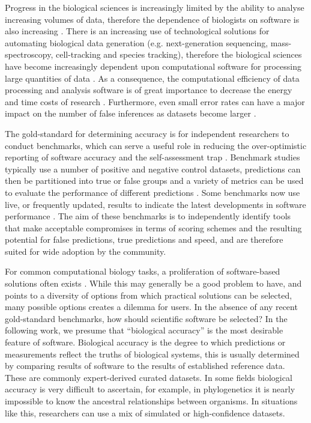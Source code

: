 \documentclass[fleqn,10pt]{SelfArx} %
\begin{document}
Progress in the biological sciences is increasingly limited by the
ability to analyse increasing volumes of data, therefore the
dependence of biologists on software is also increasing
\cite{Marx2013-zi}. There is an increasing use of technological
solutions for automating biological data generation
(e.g. next-generation sequencing, mass-spectroscopy, cell-tracking and
species tracking), therefore the biological sciences have become
increasingly dependent upon computational software for processing
large quantities of data \cite{Marx2013-zi}. As a consequence, the
computational efficiency of data processing and analysis software is
of great importance to decrease the energy and time costs of research
\cite{Gombiner2011-md}. Furthermore, even small error rates can have a
major impact on the number of false inferences as datasets become
larger \cite{Storey2003-cv}.

The gold-standard for determining accuracy is for independent
researchers to conduct benchmarks, which can serve a useful role in
reducing the over-optimistic reporting of software accuracy
\cite{Boulesteix2010-te,Jelizarow2010-zf} and the self-assessment trap
\cite{Norel2011-cq}. Benchmark studies typically use a number of
positive and negative control datasets, predictions can then be
partitioned into true or false groups and a variety of metrics can be
used to evaluate the performance of different predictions
\cite{Egan1975-nd,Hall2012-kg}. Some benchmarks now use live, or
frequently updated, results to indicate the latest developments in
software performance
\cite{Bujnicki2001-xr,Puton2014-hy,Barton_undated-er}. The aim of
these benchmarks is to independently identify tools that make
acceptable compromises in terms of scoring schemes and the resulting
potential for false predictions, true predictions and speed, and are
therefore suited for wide adoption by the community.

For common computational biology tasks, a proliferation of
software-based solutions often exists
\cite{Felsenstein1995-ic,Altschul2013-bv,Henry2014-ut,Wikipedia_contributors2015-vj,Wikipedia_contributors2015-hr}. While
this may generally be a good problem to have, and points to a
diversity of options from which practical solutions can be selected,
many possible options creates a dilemma for users. In the absence of
any recent gold-standard benchmarks, how should scientific software be
selected? In the following work, we presume that ``biological
accuracy'' is the most desirable feature of software. Biological
accuracy is the degree to which predictions or measurements reflect
the truths of biological systems, this is usually determined by
comparing results of software to the results of established reference
data. These are commonly expert-derived curated datasets. In some
fields biological accuracy is very difficult to ascertain, for
example, in phylogenetics it is nearly impossible to know the
ancestral relationships between organisms. In situations like this,
researchers can use a mix of simulated or high-confidence datasets.
\end{document}
